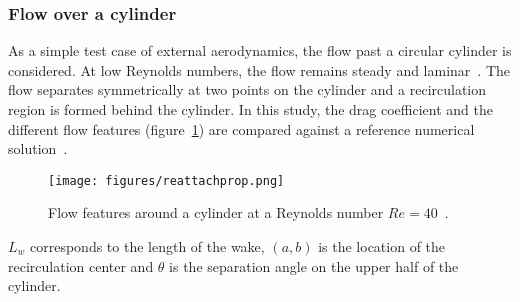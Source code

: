 \subsubsection{Flow over a cylinder}
As a simple test case of external aerodynamics, the flow past a circular cylinder is considered. At low Reynolds numbers, the flow remains steady and laminar~\cite{cylinderref}. The flow separates symmetrically at two points on the cylinder and a recirculation region is formed behind the cylinder. In this study, the drag coefficient and the different flow features (figure~\ref{fig:cylflfeatures}) are compared against a reference numerical solution~\cite{cylinderref}. 
\begin{figure}[h!]
    \centering
    \captionsetup{justification=centering}
    \texttt{[image: figures/reattachprop.png]}
    \caption{Flow features around a cylinder at a Reynolds number $Re=40$~\cite{cylinderref}.}
     \label{fig:cylflfeatures}
\end{figure}
$L_w$ corresponds to the length of the wake, $(a,b)$ is the location of the recirculation center and $\theta$ is the separation angle on the upper half of the cylinder.

